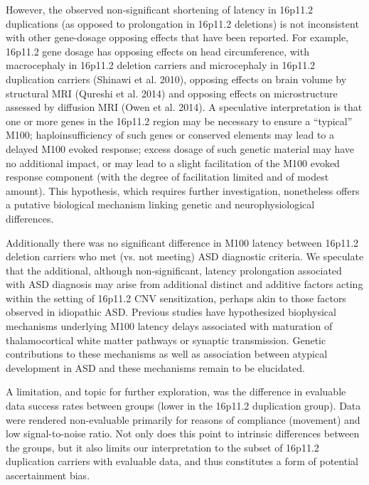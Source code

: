 \documentclass{article}
\begin{document}
However, the observed non-significant shortening of latency in 16p11.2 duplications (as opposed to prolongation in 16p11.2 deletions) is not inconsistent with other gene-dosage opposing effects that have been reported.  For example, 16p11.2 gene dosage has opposing effects on head circumference, with macrocephaly in 16p11.2 deletion carriers and microcephaly in 16p11.2 duplication carriers (Shinawi et al. 2010), opposing effects on brain volume by structural MRI (Qureshi et al. 2014) and opposing effects on microstructure assessed by diffusion MRI (Owen et al. 2014). A speculative interpretation is that one or more genes in the 16p11.2 region may be necessary to ensure a “typical” M100; haploinsufficiency of such genes or conserved elements may lead to a delayed M100 evoked response; excess dosage of such genetic material may have no additional impact, or may lead to a slight facilitation of the M100 evoked response component (with the degree of facilitation limited and of modest amount). This hypothesis, which requires further investigation, nonetheless offers a putative biological mechanism linking genetic and neurophysiological differences.  

\medskip

Additionally there was no significant difference in M100 latency between 16p11.2 deletion carriers who met (vs. not meeting) ASD diagnostic criteria. We speculate that the additional, although non-significant, latency prolongation associated with ASD diagnosis may arise from additional distinct and additive factors acting within the setting of 16p11.2 CNV sensitization, perhaps akin to those factors observed in idiopathic ASD. Previous studies have hypothesized biophysical mechanisms underlying M100 latency delays associated with maturation of thalamocortical white matter pathways or synaptic transmission. Genetic contributions to these mechanisms as well as association between atypical development in ASD and these mechanisms remain to be elucidated.  

\medskip


A limitation, and topic for further exploration, was the difference in evaluable data success rates between groups (lower in the 16p11.2 duplication group). Data were rendered non-evaluable primarily for reasons of compliance (movement) and low signal-to-noise ratio. Not only does this point to intrinsic differences between the groups, but it also limits our interpretation to the subset of 16p11.2 duplication carriers with evaluable data, and thus constitutes a form of potential ascertainment bias.   
\end{document}
